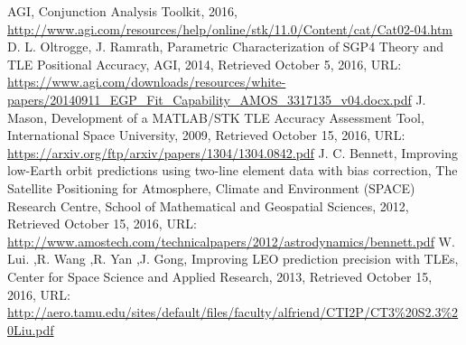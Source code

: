 \documentclass[12pt,openany,a4paper]{book}
\begin{document}
\begin{thebibliography}{99}
		AGI, Conjunction Analysis Toolkit, 2016,  \url{http://www.agi.com/resources/help/online/stk/11.0/Content/cat/Cat02-04.htm}
		D. L. Oltrogge, J. Ramrath, Parametric Characterization of SGP4 Theory and TLE Positional Accuracy, AGI, 2014, Retrieved October 5, 2016, URL:		\url{https://www.agi.com/downloads/resources/white-papers/20140911_EGP_Fit_Capability_AMOS_3317135_v04.docx.pdf}
		J. Mason, Development of a MATLAB/STK TLE Accuracy Assessment Tool, International Space University, 2009, Retrieved October 15, 2016, URL:		\url{https://arxiv.org/ftp/arxiv/papers/1304/1304.0842.pdf}
		J. C. Bennett, Improving low-Earth orbit predictions using two-line element data with bias correction, 	
		The Satellite Positioning for Atmosphere, Climate and Environment (SPACE) Research Centre,
		School of Mathematical and Geospatial Sciences, 2012, Retrieved October 15, 2016, URL:		\url{http://www.amostech.com/technicalpapers/2012/astrodynamics/bennett.pdf}
		W. Lui.  ,R. Wang ,R. Yan ,J. Gong, Improving LEO prediction precision with TLEs, Center for Space Science and Applied Research, 2013, Retrieved October 15, 2016, URL:		\url{http://aero.tamu.edu/sites/default/files/faculty/alfriend/CTI2P/CT3%20S2.3%20Liu.pdf}

		
		
%			
			
		
	\end{thebibliography}
	
\end{document}
